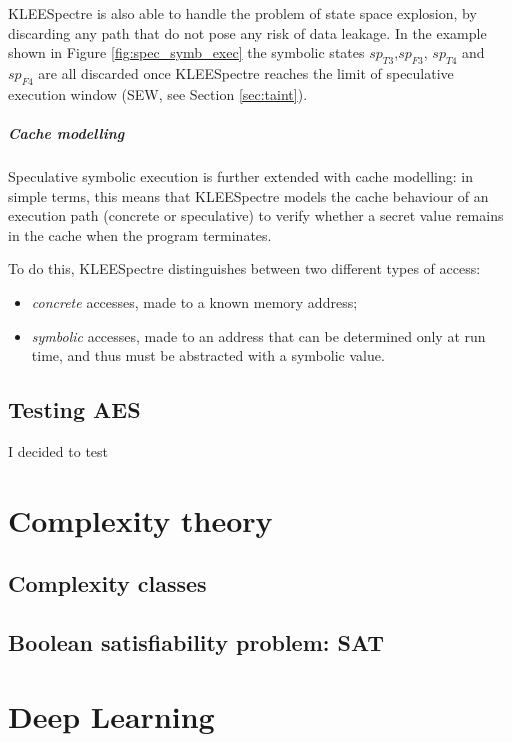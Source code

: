 \documentclass[12pt,a4paper]{book}
\theoremstyle{definition}
\begin{document}
	KLEESpectre is also able to handle the problem of state space explosion, by discarding any path that do not pose any risk of data leakage. In the example shown in Figure \ref{fig:spec_symb_exec} the symbolic states $sp_{T3}$,$sp_{F3}$, $sp_{T4}$ and $sp_{F4}$ are all discarded once KLEESpectre reaches the limit of speculative execution window (SEW, see Section \ref{sec:taint}). 
	\paragraph{Cache modelling} Speculative symbolic execution is further extended with cache modelling: in simple terms, this means that KLEESpectre models the cache behaviour of an execution path (concrete or speculative) to verify whether a secret value remains in the cache when the program terminates. 
	
	To do this, KLEESpectre distinguishes between two different types of access:
	\begin{itemize}
		\item \textit{concrete} accesses, made to a known memory address;
		\item \textit{symbolic} accesses, made to an address that can be determined only at run time, and thus must be abstracted with a symbolic value. 
	\end{itemize}
	
	\section{Testing AES}\label{sec:testing}
	I decided to test 
	
	\appendix
	\chapter{Complexity theory}\label{appendix:complexity}
	\section{Complexity classes}
	\section{Boolean satisfiability problem: SAT}
	\chapter{Deep Learning}\label{appendix:dl}
\end{document}
